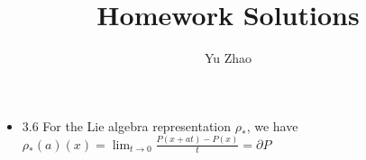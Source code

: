 \documentclass[12pt,letterpaper]{article}
\makeatletter
\newcommand\course[1]{\renewcommand\@course{#1}}
\newcommand\@course{}
\newcommand\term[1]{\renewcommand\@term{#1}}
\newcommand\@term{}
\theoremstyle{plain}
\theoremstyle{definition}
\theoremstyle{remark}
\makeatother
\begin{document}
\course{lie group}
\term{}
\title{Homework  Solutions}
\author{Yu Zhao}
\maketitle
\begin{itemize}
\item 3.6 For the Lie algebra representation $\rho_*$, we have $\rho_*(a)(x)=\lim_{t\to 0}\frac{P(x+at)-P(x)}{t}=\partial P$
\end{itemize}
\end{document}
